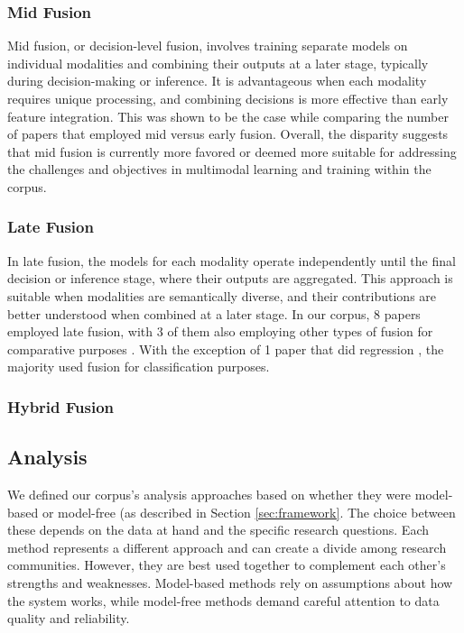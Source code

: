 \documentclass[manuscript,screen,review]{acmart}
\begin{document}
\subsubsection{Mid Fusion}

Mid fusion, or decision-level fusion, involves training separate models on individual modalities and combining their outputs at a later stage, typically during decision-making or inference. It is advantageous when each modality requires unique processing, and combining decisions is more effective than early feature integration. This was shown to be the case while comparing the number of papers that employed mid versus early fusion. Overall, the disparity suggests that mid fusion is currently more favored or deemed more suitable for addressing the challenges and objectives in multimodal learning and training within the corpus. 

\subsubsection{Late Fusion}

In late fusion, the models for each modality operate independently until the final decision or inference stage, where their outputs are aggregated. This approach is suitable when modalities are semantically diverse, and their contributions are better understood when combined at a later stage. In our corpus, 8 papers employed late fusion, with 3 of them also employing other types of fusion for comparative purposes \cite{1315379489,2936220551,4277812050}. With the exception of 1 paper that did regression \cite{2836996318}, the majority used fusion for classification purposes.
 
\subsubsection{Hybrid Fusion}


\subsection{Analysis}\label{subsec:findings_analysis}

We defined our corpus's analysis approaches based on whether they were model-based or model-free (as described in Section \ref{sec:framework}. The choice between these depends on the data at hand and the specific research questions. Each method represents a different approach and can create a divide among research communities. However, they are best used together to complement each other's strengths and weaknesses. Model-based methods rely on assumptions about how the system works, while model-free methods demand careful attention to data quality and reliability.
\end{document}
